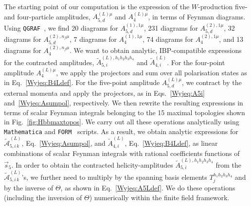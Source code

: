 \documentclass[main.tex]{subfiles}
\begin{document}
The starting point of our computation is the expression of the $W$-production five- and
four-particle amplitudes, $A_{5,d}^{(L)\mu}$ and $A_4^{(L)\mu}$, in terms of Feynman diagrams. Using \texttt{QGRAF}~\cite{Nogueira:1991ex}, we find 20 diagrams for $A_{5,d}^{(1),1 \mu}$, 231 diagrams for $A_{5,d}^{(2),1 \mu}$, 32 diagrams for $A_{5,d}^{(2),n_f \mu}$, 7 diagrams for $A_{4}^{(1),1 \mu}$, 74 diagrams for $A_{4}^{(2),1 \mu}$, and 13 diagrams for $A_{4}^{(2),n_f \mu}$. We want to obtain analytic, IBP-compatible expressions for the contracted amplitudes, $\tilde{A}_{5,i}^{(L),h_1 h_2 h_3 h_4}$ and $\tilde{A}_{4,i}^{(L)}$. For the four-point amplitude $A^{(L)\mu}_{4}$, we apply the projectors and sum over all polarisation states as in Eq.~\ref{Wyjeq:B4Ldef}. For the five-point amplitude $A^{(L)\mu}_{5,d}$, we contract by the external momenta and apply the projectors, as in Eqs.~\ref{Wyjeq:A5i} and~\ref{Wyjeq:Asumpol}, respectively. We then rewrite the resulting expressions in terms of scalar Feynman integrals belonging to the 15 maximal topologies shown in %
Fig.~\ref{fig:Hbbmaxtopos}. We carry out all these operations analytically using \texttt{Mathematica} and \texttt{FORM}~\cite{Kuipers:2012rf,Ruijl:2017dtg} scripts. As a result, we obtain analytic expressions for $\tilde{\mathcal{A}}_{5,i\, k}^{(L)}$, Eq.~\ref{Wyjeq:Asumpol}, and $\tilde{A}_{4,i}^{(L)}$, Eq.~\ref{Wyjeq:B4Ldef}, as linear combinations of scalar Feynman integrals with rational coefficients functions of $\vec{s}_5$. 
In order to obtain the contracted helicity-amplitudes $\tilde{A}_{5,i}^{(L), h_1h_2h_3h_4}$ from the $\tilde{\mathcal{A}}_{5,i\, k}^{(L)}$'s, we further need to multiply by the spanning basis elements $T^{h_1h_2h_3h_4}_{j}$ and by the inverse of $\Theta$, as shown in Eq.~\ref{Wyjeq:A5Ldef}. We do these operations (including the inversion of $\Theta$) numerically within the finite field framework.
\end{document}
